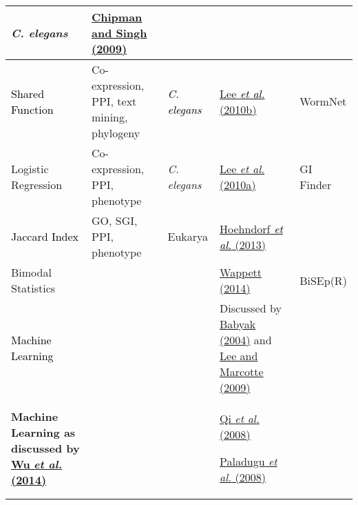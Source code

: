\begin{flushleft}
\begin{supertabular}{m{4.421cm}|m{2.342cm}|m{2.388cm}|m{4.552cm}|m{2.299cm}}
\textit{C. elegans} &
\hyperlink{ENREF22}{Chipman and Singh (2009)} &
~
\\\hline
{}\color{black}
\textcolor{black}{Shared Function} &
\color{black}
Co-expression, PPI, text mining, phylogeny &
\color{black}
\textit{\textcolor{black}{C. elegans}} &
\color{black}
\hyperlink{ENREF63}{Lee}\hyperlink{ENREF63}{\textit{\textcolor{black}{
et al.}}}\hyperlink{ENREF63}{ (2010b)} &
\color{black}
WormNet\\\hline
Logistic Regression &
Co-expression, PPI, phenotype &
\textit{C. elegans} &
\hyperlink{ENREF62}{Lee}\hyperlink{ENREF62}{\textit{ et
al.}}\hyperlink{ENREF62}{ (2010a)} &
GI Finder\\\hline
{}\color{black}
\textcolor{black}{Jaccard Index} &
\color{black} GO, SGI,
PPI, phenotype &
\color{black} Eukarya &
\color{black}
\hyperlink{ENREF50}{Hoehndorf}\hyperlink{ENREF50}{\textit{\textcolor{black}{
et al.}}}\hyperlink{ENREF50}{ (2013)} &
~
\\\hline
Bimodal Statistics &
~
 &
~
 &
\hyperlink{ENREF110}{Wappett (2014)} &
BiSEp(R)\\\hline
{}\color{black}
\textcolor{black}{Machine Learning} &
~
 &
~
 &
\color{black} Discussed by
\hyperlink{ENREF6}{Babyak (2004)} and \hyperlink{ENREF64}{Lee and
Marcotte (2009)} &
~
\\\hline
\textbf{Machine Learning as discussed by
}\hyperlink{ENREF114}{\textbf{Wu}}\hyperlink{ENREF114}{\textbf{\textit{
et al.}}}\hyperlink{ENREF114}{\textbf{ (2014)}} &
~
 &
~
 &
\hyperlink{ENREF81}{Qi}\hyperlink{ENREF81}{\textit{ et
al.}}\hyperlink{ENREF81}{ (2008)}

\hyperlink{ENREF78}{Paladugu}\hyperlink{ENREF78}{\textit{ et
al.}}\hyperlink{ENREF78}{ (2008)}


\end{supertabular}
\end{flushleft}
